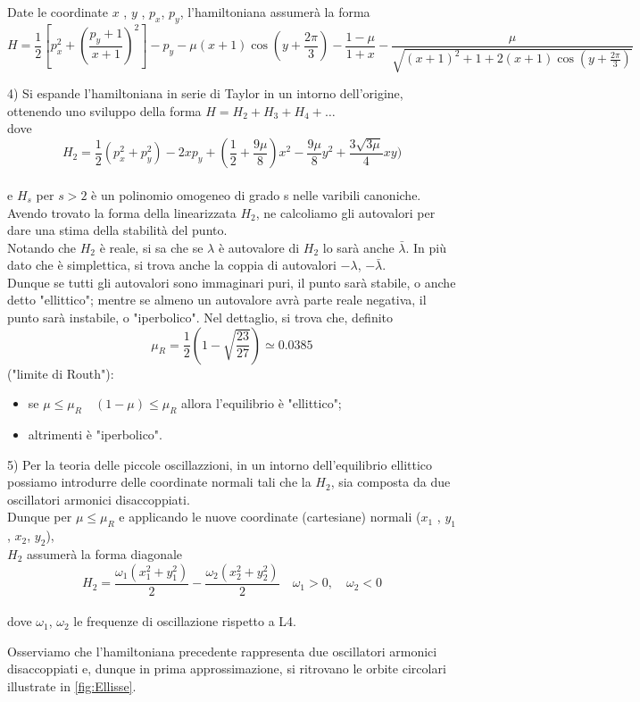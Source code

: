 \documentclass[a4paper,11pt,titlepage]{report}
\theoremstyle{definition}
\theoremstyle{plain}
\begin{document}
Date le coordinate $ x $ , $ y $ , $ p_x $, $ p_y $, l'hamiltoniana assumerà la forma
$$ H = \frac{1}{2} [ p_x^2 + (\frac{p_y+1}{x+1})^2] -p_y - \mu (x+1)\cos( y + \frac{2\pi}{3} ) - \frac{1- \mu}{1+x} - \frac{\mu}{\sqrt{( x+1 )^2+1+2(x+1)\cos(y+\frac{2\pi}{3})}} $$


4) Si espande l'hamiltoniana in serie di Taylor in un intorno dell'origine, ottenendo uno sviluppo della forma $ H = H_2 + H_3 + H_4 +\dots $
\\dove $$ H_2 = \frac{1}{2} ( p_x^2 + p_y^2) - 2xp_y + ( \frac{1}{2} + \frac{9\mu}{8})x^2 - \frac{9\mu}{8}y^2 + \frac{3 \sqrt{3 \mu}}{4} xy) $$
\\e $ H_s $ per $ s > 2 $ è un polinomio omogeneo di grado s nelle varibili canoniche.
Avendo trovato la forma della linearizzata $H_2$, ne calcoliamo gli autovalori per dare una stima della stabilità del punto.\\
Notando che $H_2$ è reale, si sa che se $\lambda$ è autovalore di $H_2$ lo sarà anche $\bar{\lambda}$. In più dato che è simplettica, si trova anche la coppia di autovalori $-\lambda$, $-\bar{\lambda}$.
\\Dunque se tutti gli autovalori sono immaginari puri, il punto sarà stabile, o anche detto "ellittico"; mentre se almeno un autovalore avrà parte reale negativa, il punto sarà instabile, o "iperbolico".
Nel dettaglio, si trova che, definito $$ \mu_R = \frac{1}{2} ( 1- \sqrt{\frac{23}{27}}) \simeq 0.0385 $$  ("limite di Routh"): 
\begin{itemize}
	\item se $\mu \leq \mu_R \quad (1-\mu) \leq \mu_R$ allora l'equilibrio è "ellittico";
	\item altrimenti è "iperbolico".
\end{itemize}
5) Per la teoria delle piccole oscillazzioni, in un intorno dell'equilibrio ellittico possiamo introdurre delle coordinate normali tali che la $H_2$, sia composta da due oscillatori armonici disaccoppiati. \\Dunque per $\mu \leq \mu_R$ e applicando le nuove coordinate (cartesiane) normali ($ x_1 $ , $ y_1 $ , $ x_2 $, $ y_2 $), \\$H_2$ assumerà la forma diagonale $$H_2 = \frac{\omega_1 (x_1^2+y_1^2)}{2} -\frac{\omega_2 (x_2^2+y_2^2)}{2} \quad \omega_1 > 0 , \quad \omega_2 < 0 $$
\\dove $ \omega_1 $, $ \omega_2 $ le frequenze di oscillazione rispetto a L4.

Osserviamo che l'hamiltoniana precedente rappresenta due oscillatori armonici disaccoppiati e, dunque in prima approssimazione, si ritrovano le orbite circolari illustrate in \ref{fig:Ellisse}.
\end{document}
